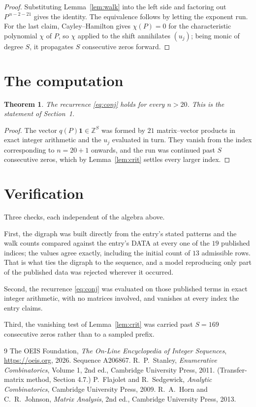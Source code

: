 \documentclass[11pt,a4paper]{article}
\theoremstyle{plain}
\newtheorem{theorem}{Theorem}
\theoremstyle{definition}
\begin{document}
\begin{proof}
Substituting Lemma~\ref{lem:walk} into the left side and factoring out
$P^{\,n-2-21}$ gives the identity. The equivalence follows by letting the exponent
run. For the last claim, Cayley--Hamilton gives $\chi(P)=0$ for the characteristic
polynomial $\chi$ of $P$, so $\chi$ applied to the shift annihilates $(u_j)$; being monic of
degree $S$, it propagates $S$ consecutive zeros forward.
\end{proof}

\section{The computation}

\begin{theorem}
The recurrence \eqref{eq:conj} holds for every $n>20$. This is the statement of
Section~1.
\end{theorem}

\begin{proof}
The vector $q(P)\mathbf{1}\in\mathbb{Z}^{S}$ was formed by $21$ matrix--vector
products in exact integer arithmetic and the $u_j$ evaluated in turn. They vanish from the
index corresponding to $n=20+1$ onwards, and the run was continued past $S$ consecutive
zeros, which by Lemma~\ref{lem:crit} settles every larger index.
\end{proof}

\section{Verification}

Three checks, each independent of the algebra above.

First, the digraph was built directly from the entry's stated patterns and the walk counts
compared against the entry's DATA at every one of the $19$ published indices; the
values agree exactly, including the initial count of $13$ admissible rows. That is
what ties the digraph to the sequence, and a model reproducing only part of the published
data was rejected wherever it occurred.

Second, the recurrence \eqref{eq:conj} was evaluated on those published terms in exact
integer arithmetic, with no matrices involved, and vanishes at every index the entry claims.

Third, the vanishing test of Lemma~\ref{lem:crit} was carried past $S=169$ consecutive
zeros rather than to a sampled prefix.

\begin{thebibliography}{9}
 The OEIS Foundation, \emph{The On-Line Encyclopedia of Integer
Sequences}, \url{https://oeis.org}, 2026. Sequence A206867.
 R.~P.~Stanley, \emph{Enumerative Combinatorics}, Volume 1, 2nd ed.,
Cambridge University Press, 2011. (Transfer-matrix method, Section 4.7.)
 P.~Flajolet and R.~Sedgewick, \emph{Analytic Combinatorics}, Cambridge
University Press, 2009.
 R.~A.~Horn and C.~R.~Johnson, \emph{Matrix Analysis}, 2nd ed., Cambridge
University Press, 2013.
\end{thebibliography}
\end{document}
